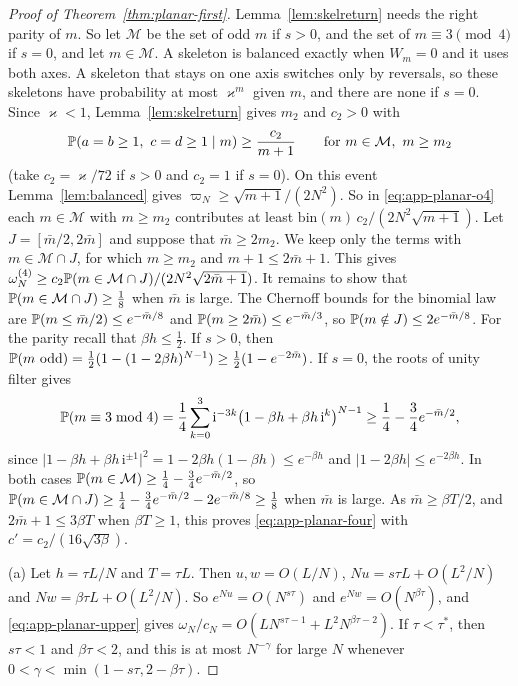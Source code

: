 \begin{proof}[Proof of Theorem~\ref{thm:planar-first}]
Lemma~\ref{lem:skelreturn} needs the right parity of $m$. So let $\mathcal M$ be the set of odd
$m$ if $s>0$, and the set of $m\equiv3\pmod4$ if $s=0$, and let $m\in\mathcal M$. A skeleton is
balanced exactly when $W_m=0$ and it uses both axes. A skeleton that stays on one axis switches
only by reversals, so these skeletons have probability at most $\varkappa^m$ given $m$, and there
are none if $s=0$. Since $\varkappa<1$, Lemma~\ref{lem:skelreturn} gives $m_2$ and $c_2>0$ with
\[
 \mathbb{P}(a=b\ge1,\ c=d\ge1\mid m)\ge\frac{c_2}{m+1}\qquad\text{for }m\in\mathcal M,\ m\ge m_2
\]
(take $c_2=\varkappa/72$ if $s>0$ and $c_2=1$ if $s=0$). On this event Lemma~\ref{lem:balanced}
gives $\varpi_N\ge\sqrt{m+1}/(2N^2)$. So in \eqref{eq:app-planar-o4} each $m\in\mathcal M$ with
$m\ge m_2$ contributes at least $\mathrm{bin}(m)\,c_2/(2N^2\sqrt{m+1})$. Let
$J=[\bar m/2,2\bar m]$ and suppose that $\bar m\ge2m_2$. We keep only the terms with
$m\in\mathcal M\cap J$, for which $m\ge m_2$ and $m+1\le2\bar m+1$. This gives
$\omega^{(4)}_N\ge c_2\mathbb{P}(m\in\mathcal M\cap J)/(2N^2\sqrt{2\bar m+1})$.
It remains to show that $\mathbb{P}(m\in\mathcal M\cap J)\ge\frac18$ when $\bar m$ is large. The
Chernoff bounds for the binomial law are $\mathbb{P}(m\le\bar m/2)\le e^{-\bar m/8}$ and
$\mathbb{P}(m\ge2\bar m)\le e^{-\bar m/3}$, so $\mathbb{P}(m\notin J)\le2e^{-\bar m/8}$. For the parity recall that
$\beta h\le\frac12$. If $s>0$, then
$\mathbb{P}(m\text{ odd})=\frac12(1-(1-2\beta h)^{N-1})\ge\frac12(1-e^{-2\bar m})$. If $s=0$, the roots of
unity filter gives
\[
 \mathbb{P}(m\equiv3\bmod4)=\frac14\sum_{k=0}^3\mathrm i^{-3k}\bigl(1-\beta h+\beta h\,\mathrm i^k\bigr)^{N-1}
 \ge\frac14-\frac34e^{-\bar m/2},
\]
since $\lvert1-\beta h+\beta h\,\mathrm i^{\pm1}\rvert^2=1-2\beta h(1-\beta h)\le e^{-\beta h}$ and
$\lvert1-2\beta h\rvert\le e^{-2\beta h}$.
In both cases $\mathbb{P}(m\in\mathcal M)\ge\frac14-\frac34e^{-\bar m/2}$, so
$\mathbb{P}(m\in\mathcal M\cap J)\ge\frac14-\frac34e^{-\bar m/2}-2e^{-\bar m/8}\ge\frac18$ when
$\bar m$ is large. As $\bar m\ge\beta T/2$, and
$2\bar m+1\le3\beta T$ when $\beta T\ge1$, this proves \eqref{eq:app-planar-four} with
$c'=c_2/(16\sqrt{3\beta})$.

(a) Let $h=\tau L/N$ and $T=\tau L$. Then $u,w=O(L/N)$, $Nu=s\tau L+O(L^2/N)$ and
$Nw=\beta\tau L+O(L^2/N)$. So $e^{Nu}=O(N^{s\tau})$ and $e^{Nw}=O(N^{\beta\tau})$, and
\eqref{eq:app-planar-upper} gives $\omega_N/c_N=O(LN^{s\tau-1}+L^2N^{\beta\tau-2})$.
If $\tau<\tau^*$, then $s\tau<1$ and $\beta\tau<2$,
and this is at most $N^{-\gamma}$ for large $N$ whenever $0<\gamma<\min(1-s\tau,2-\beta\tau)$.


\end{proof}

